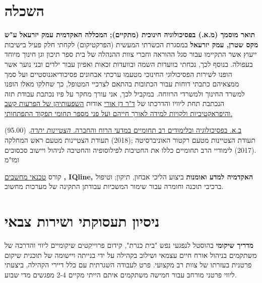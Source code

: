 \section{השכלה}

{\textbf{תואר מוסמך (מ.א.) בפסיכולוגיה חינוכית (מתקיים); המכללה האקדמית עמק יזרעאל ע"ש מקס שטרן, עמק יזרעאל}}
{במסגרת הכשרתי המעשית (הפרקטיקום) לקחתי חלק פעיל בישיבות ייעוץ אשר התקיימו עבור סגל ההוראה וחברי צוות ההנהלה של בית ספר תיכון וגן חינוך מיוחד בעפולה. בנוסף לכך, נכחתי בוועדות השמה ובוועדות זכאות ואפיון עבור ילדים ובני נוער אשר הופנו לשירות הפסיכולוגי החינוכי מטעמו  ערכתי אבחונים פסיכודיאגנוסטיים ועל סמך ממצאיהם כתבתי דוחות עבור הכתובות בהתאם לצרכיי המטופל, כך שחלקו מאלו הופנו למשרד החינוך ולמשרדי הרווחה. במקביל לכך, אני עורך מחקר על פיו נכתבת עבודת תזה הנכתבת תחת ליוויו והדרכתו של 
	\href{https://www.researchgate.net/scientific-contributions/Orrie-Dan-2172412162}{ד"ר דן אורי} אודות 
	\href{https://tinyurl.com/ADHD-Coping-Seminar}{השפעותיהן של הפרעות קשב והיפראקטיביות ולקויות למידה לאורך חייהם ועל פני מספר תחומי תפקוד התפתחותי.}}
{}

{\href{https://www.dropbox.com/s/pcm0mybvgi85ma0/BA-Psych.pdf}{ב.א. בפסיכולוגיה ובלימודים רב תחומיים במדעי הרוח והחברה. \textit{הצטיינות יתרה}}, 
(95.00)}
{תעודת הצטיינות מטעם רקטור האוניברסיטה ;(2018) תעודת הצטיינות מטעם ראש המחלקה .(2017)
לימודיי הרב תחומיים כללו את החטיבות לפילוסופיה והחטיבה לניהול ויישוב סכסוכים ומו"מ}
{}

\par{\par}

 {קורס
\href{https://www.dropbox.com/s/csphxdynjdg3ze2/computer-technitian-certificate.jpg}{טכנאי מחשבים}
		\textbf{, IQline, האקדמיה למדע ואומנות}}
{ביצוע הליכי אבחון, תיקון; וטיפול ברכיבי תוכנה וחומרה עבור שימור המשכיות עבודתן התקינה של מערכות מחשוב.}
{}
{}

\section{ניסיון תעסוקתי ושירות צבאי}

{\textbf{מדריך שיקומי}  בהוסטל לנפגעי נפש "בית כנרת", קידום פרוייקטים שיקומיים}
{ליווי והדרכה של משתקמים בניהול אורח חיים עצמאי ושילוב בקהילה על ידי בנייתה ויישומה של תוכנית שיקום פרטנית בעזרתו של צוות רב מקצועי. פרט לעבודה השגרתית עם כלל דיירי הקהילה, ביצעתי ליווי פרטני מורחב עבור חמישה משתקמים איתם הייתי מקיים 2-4 מפגשים מדי שבוע.}
{}

